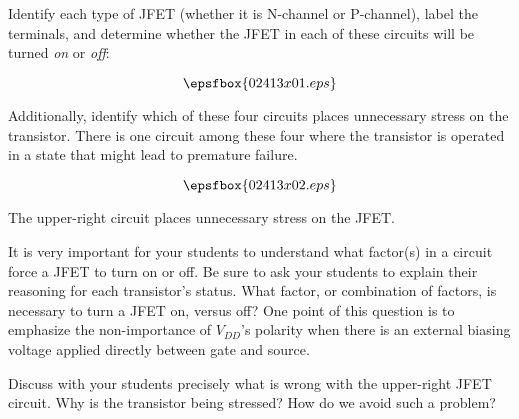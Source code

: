 

Identify each type of JFET (whether it is N-channel or P-channel), label the terminals, and determine whether the JFET in each of these circuits will be turned {\it on} or {\it off}:

$$\epsfbox{02413x01.eps}$$

Additionally, identify which of these four circuits places unnecessary stress on the transistor.  There is one circuit among these four where the transistor is operated in a state that might lead to premature failure.







$$\epsfbox{02413x02.eps}$$

The upper-right circuit places unnecessary stress on the JFET.







It is very important for your students to understand what factor(s) in a circuit force a JFET to turn on or off.  Be sure to ask your students to explain their reasoning for each transistor's status.  What factor, or combination of factors, is necessary to turn a JFET on, versus off?  One point of this question is to emphasize the non-importance of $V_{DD}$'s polarity when there is an external biasing voltage applied directly between gate and source.

Discuss with your students precisely what is wrong with the upper-right JFET circuit.  Why is the transistor being stressed?  How do we avoid such a problem?




